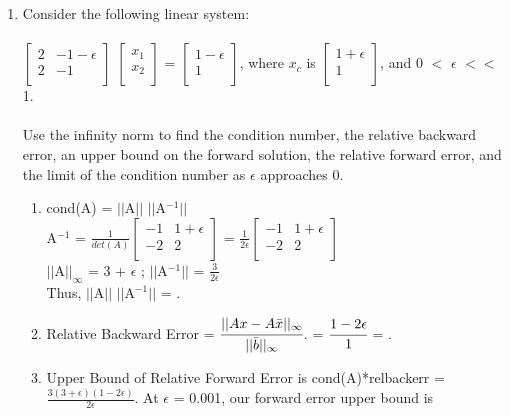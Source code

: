 \documentclass[12pt]{article}
\begin{document}
\begin{enumerate}
\pagebreak
\item Consider the following linear system: \\ \\
$\begin{bmatrix}
    2 & -1-\epsilon\\
   2 & -1 \\
\end{bmatrix}$ $\begin{bmatrix}
   x_1 \\
   x_2 \\
\end{bmatrix}$ = $\begin{bmatrix}
   1-\epsilon \\
   1 \\
\end{bmatrix}$, where $x_c$ is $\begin{bmatrix}
   1+\epsilon \\
   1 \\
\end{bmatrix}$, and 0 $<$ $\epsilon$ $<<$ 1. \\ \\
Use the infinity norm to find the condition number, the relative backward error, an upper bound on the forward solution, the relative forward error, and the limit of the condition number as $\epsilon$ approaches 0.
	\begin{enumerate}
		\item cond(A) = $||$A$||$ $||$A$^{-1}||$ \\
		A$^{-1}$ = $\frac{1}{det(A)} \begin{bmatrix}
    -1 & 1+\epsilon\\
   -2 & 2 \\
\end{bmatrix}$ =  $\frac{1}{2\epsilon} \begin{bmatrix}
    -1 & 1+\epsilon\\
   -2 & 2 \\
\end{bmatrix}$ \\
$||$A$||_{\infty}$ = 3 + $\epsilon$ ; $||$A$^{-1}||$ = $\frac{3}{2\epsilon}$ \\
Thus, $||$A$||$ $||$A$^{-1}||$ = .
\item Relative Backward Error = $\cfrac{||Ax - A\bar{x}||_{\infty}}{||\bar{b}||_{\infty}}$. = $\cfrac{1-2\epsilon}{1}$ = .
\item Upper Bound of Relative Forward Error is cond(A)*relbackerr = $\frac{3(3+\epsilon)(1-2\epsilon)}{2\epsilon}$. At $\epsilon$ = 0.001, our forward error upper bound is 

\end{enumerate}
\end{enumerate}
\end{document}
